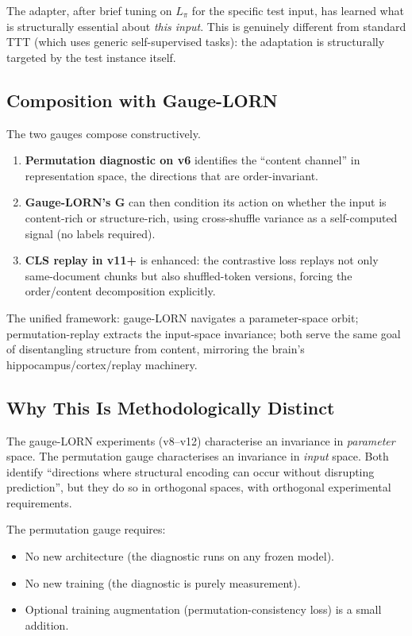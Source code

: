 \documentclass[11pt, a4paper]{article}
\theoremstyle{plain}
\theoremstyle{definition}
\theoremstyle{remark}
\begin{document}
The adapter, after brief tuning on $L_\pi$ for the specific test input, has learned what is structurally essential about \emph{this input}.
This is genuinely different from standard TTT (which uses generic self-supervised tasks): the adaptation is structurally targeted by the test instance itself.

\subsection{Composition with Gauge-LORN}

The two gauges compose constructively.

\begin{enumerate}[nosep]
\item \textbf{Permutation diagnostic on v6} identifies the ``content channel'' in representation space, the directions that are order-invariant.
\item \textbf{Gauge-LORN's G} can then condition its action on whether the input is content-rich or structure-rich, using cross-shuffle variance as a self-computed signal (no labels required).
\item \textbf{CLS replay in v11+} is enhanced: the contrastive loss replays not only same-document chunks but also shuffled-token versions, forcing the order/content decomposition explicitly.
\end{enumerate}

The unified framework: gauge-LORN navigates a parameter-space orbit; permutation-replay extracts the input-space invariance; both serve the same goal of disentangling structure from content, mirroring the brain's hippocampus/cortex/replay machinery.

\subsection{Why This Is Methodologically Distinct}

The gauge-LORN experiments (v8--v12) characterise an invariance in \emph{parameter} space.
The permutation gauge characterises an invariance in \emph{input} space.
Both identify ``directions where structural encoding can occur without disrupting prediction'', but they do so in orthogonal spaces, with orthogonal experimental requirements.

The permutation gauge requires:
\begin{itemize}[nosep]
\item No new architecture (the diagnostic runs on any frozen model).
\item No new training (the diagnostic is purely measurement).
\item Optional training augmentation (permutation-consistency loss) is a small addition.
\end{itemize}
\end{document}
